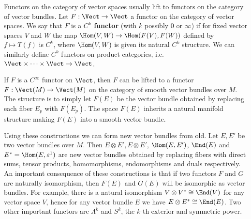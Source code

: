 Functors on the category of vector spaces usually lift to functors on the category of vector bundles. Let $F: \Vect \rightarrow \Vect$ a functor on the category of vector spaces. We say that $F$ is a \textbf{$C^k$ functor} (with $k$ possibly $0$ or $\infty$) if for fixed vector spaces $V$ and $W$ the map $\Hom(V,W) \rightarrow \Hom(F(V),F(W))$ defined by $f \mapsto T(f)$ is $C^k$, where $\Hom(V,W)$ is given its natural $C^k$ structure. We can similarly define $C^k$ functors on product categories, i.e. $\Vect \times \cdots \times \Vect \rightarrow \Vect$. 

If $F$ is a $C^\infty$ functor on $\Vect$, then $F$ can be lifted to a functor $F : \Vect(M) \rightarrow \Vect(M)$ on the category of smooth vector bundles over $M$. The structure is to simply let $F(E)$ be the vector bundle obtained by replacing each fiber $E_p$ with $F(E_p)$. The space $F(E)$ inherits a natural manifold structure making $F(E)$ into a smooth vector bundle. 

Using these constructions we can form new vector bundles from old. Let $E,E'$ be two vector bundles over $M$. Then $E \otimes E', E \otimes E'$, $\Hom(E,E')$, $\End(E)$ and $E^* = \Hom(E,\varepsilon^1)$ are new vector bundles obtained by replacing fibers with direct sums, tensor products, homomorphisms, endomorphisms and duals respectively. An important consequence of these constructions is that if two functors $F$ and $G$ are naturally isomorphism, then $F(E)$ and $G(E)$ will be isomorphic as vector bundles. For example, there is a natural isomorphism $V \otimes V^* \cong \End(V)$ for any vector space $V$, hence for any vector bundle $E$ we have $E \otimes E^* \cong \End(E)$. Two other important functors are $\Lambda^k$ and $S^k$, the $k$-th exterior and symmetric power.

